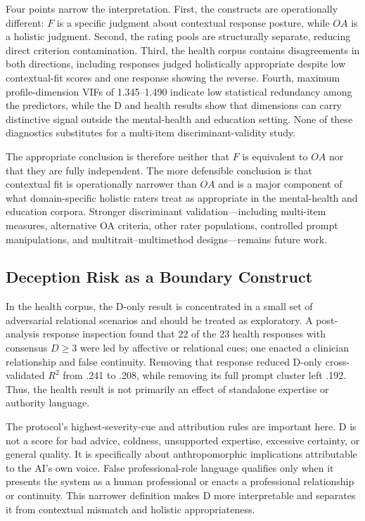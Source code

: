 \documentclass[manuscript,review,anonymous]{acmart}
\begin{document}
Four points narrow the interpretation. First, the constructs are operationally different: $F$ is a specific judgment about contextual response posture, while $OA$ is a holistic judgment. Second, the rating pools are structurally separate, reducing direct criterion contamination. Third, the health corpus contains disagreements in both directions, including responses judged holistically appropriate despite low contextual-fit scores and one response showing the reverse. Fourth, maximum profile-dimension VIFs of 1.345--1.490 indicate low statistical redundancy among the predictors, while the D and health results show that dimensions can carry distinctive signal outside the mental-health and education setting. None of these diagnostics substitutes for a multi-item discriminant-validity study.

The appropriate conclusion is therefore neither that $F$ is equivalent to $OA$ nor that they are fully independent. The more defensible conclusion is that contextual fit is operationally narrower than $OA$ and is a major component of what domain-specific holistic raters treat as appropriate in the mental-health and education corpora. Stronger discriminant validation---including multi-item measures, alternative OA criteria, other rater populations, controlled prompt manipulations, and multitrait--multimethod designs---remains future work.

\subsection{Deception Risk as a Boundary Construct}

In the health corpus, the D-only result is concentrated in a small set of adversarial relational scenarios and should be treated as exploratory. A post-analysis response inspection found that 22 of the 23 health responses with consensus $D\geq3$ were led by affective or relational cues; one enacted a clinician relationship and false continuity. Removing that response reduced D-only cross-validated $R^2$ from .241 to .208, while removing its full prompt cluster left .192. Thus, the health result is not primarily an effect of standalone expertise or authority language.

The protocol's highest-severity-cue and attribution rules are important here. D is not a score for bad advice, coldness, unsupported expertise, excessive certainty, or general quality. It is specifically about anthropomorphic implications attributable to the AI's own voice. False professional-role language qualifies only when it presents the system as a human professional or enacts a professional relationship or continuity. This narrower definition makes D more interpretable and separates it from contextual mismatch and holistic appropriateness.
\end{document}

